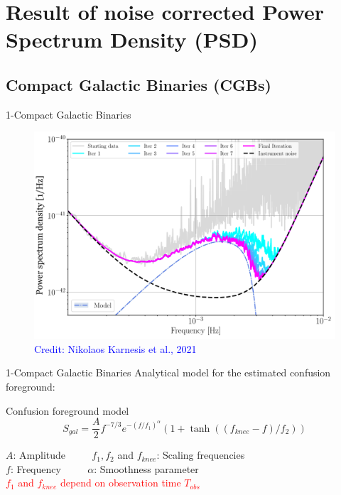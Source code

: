 \documentclass[pdf]{beamer}
\newcommand{\credit}[1]{\tiny{\textcolor{blue}{Credit: #1}}}
\begin{document}
\section{Result of noise corrected Power Spectrum Density (PSD)}
\subsection{Compact Galactic Binaries (CGBs)}
\begin{frame}{1-Compact Galactic Binaries}
\begin{figure}
\includegraphics[scale=.22]{fig/MainPSD.png}
\caption*{\credit{Nikolaos Karnesis et al., 2021}}
\end{figure}
\end{frame}


\begin{frame}{1-Compact Galactic Binaries}
Analytical model for the estimated confusion foreground:
\begin{block}{Confusion foreground model}
\begin{equation*}
S_{gal}  = \dfrac{A}{2} f^{-7/3} e^{-(f/f_1)^\alpha} (1+\tanh((f_{knee}-f)/f_2))
\end{equation*}
\end{block}
$A$: Amplitude $\qquad$ $f_1, f_2$ and $f_{knee}$: Scaling frequencies \\
$f$: Frequency $\qquad$ $\alpha$: Smoothness parameter \\
\vspace{.5cm}
\hspace{.5cm}
\textcolor{red}{$f_1$ and $f_{knee}$ depend on observation time $T_{obs}$}
\end{frame}
\end{document}
